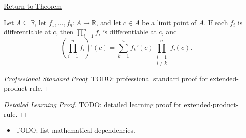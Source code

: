 \newpage
{}
\label{prf:extended-product-rule}

\begin{remark*}[Return]
\hyperref[cor:extended-product-rule]{Return to Theorem}
\end{remark*}

\begin{corollary*}
Let $A \subseteq \mathbb{R}$, let $f_1, \dots, f_n : A \to \mathbb{R}$, and let $c \in A$ be a limit point of $A$. If each $f_i$ is differentiable at $c$, then $\prod_{i=1}^{n} f_i$ is differentiable at $c$, and
\[
\left(\prod_{i=1}^{n} f_i\right)'(c)
=
\sum_{k=1}^{n}
f_k'(c) \prod_{\substack{i=1\\i\neq k}}^{n} f_i(c).
\]
\end{corollary*}

\begin{proof}[Professional Standard Proof]
\LRAProofBodyStart
TODO: professional standard proof for extended-product-rule.
\end{proof}

\begin{proof}[Detailed Learning Proof]
\LRAProofBodyStart
TODO: detailed learning proof for extended-product-rule.
\end{proof}

\begin{remark*}
\end{remark*}

\begin{dependencies}
\begin{itemize}
  \item TODO: list mathematical dependencies.
\end{itemize}
\end{dependencies}

\clearpage
